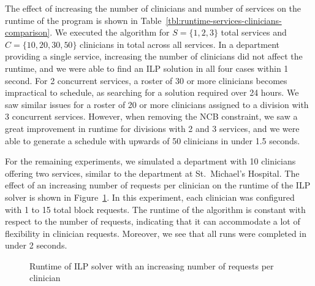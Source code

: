 The effect of increasing the number of clinicians and number of services %
on the runtime of the program is shown in Table~\ref{tbl:runtime-services-clinicians-comparison}.
We executed the algorithm for
$S = \{1, 2, 3\}$ total services and $C = \{10, 20, 30, 50\}$ clinicians in  
total across all services. 
In a department providing a single service, increasing the number of clinicians
did not affect the runtime, and we were able to find an ILP solution in all four cases
within 1 second.
For 2 concurrent services, a roster of 30 or more
clinicians becomes impractical to schedule, as searching for a solution required
over 24 hours. We saw similar issues for a roster of 20 or more clinicians
assigned to a division with 3 concurrent services. However, when removing the
NCB constraint, we saw a great improvement in runtime for divisions with 2 and 3
services, and we were able to generate a schedule with upwards of 50 clinicians
in under 1.5 seconds.  %



For the remaining experiments, we simulated a department with 10 clinicians offering 
two services, similar to the department at St.\ Michael's Hospital. 
The effect of an increasing number of requests per clinician on the runtime of
the ILP solver is shown in Figure~\ref{fig:runtime-requests}.
In this experiment, each clinician was configured with 1 to 15 total block requests.
The runtime of the algorithm is constant with respect to the number of requests,
indicating that it can accommodate a lot of flexibility in
clinician requests. Moreover, we see that all runs were completed in under
2 seconds.

\begin{figure}[h]
	\centering
	\def\svgwidth{\columnwidth}
	\caption{Runtime of ILP solver with an increasing number of requests per clinician}
  \label{fig:runtime-requests}
\end{figure}

